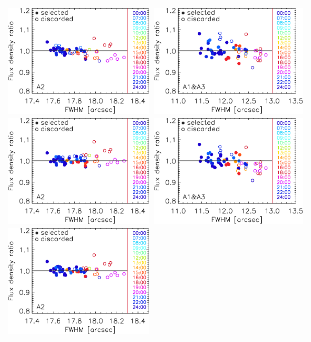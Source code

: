\begin{figure}[ht!]
\begin{center}
    \includegraphics[clip=true, width=0.3337\textwidth]{Figures/Calibration/plot_flux_density_ratio_fwhm_uranus_skydip_narrow_a2.pdf}
    \vspace{0.3cm}
    \includegraphics[clip=true, width=0.35\textwidth]{Figures/Calibration/plot_flux_density_ratio_fwhm_uranus_corrected_skydip_photocorr_demo_narrow_1mm.pdf}\hspace{0.2cm}
    \includegraphics[clip=true, width=0.3337\textwidth]{Figures/Calibration/plot_flux_density_ratio_fwhm_uranus_corrected_skydip_photocorr_demo_narrow_a2.pdf}
    \vspace{0.3cm}
    \includegraphics[clip=true, width=0.35\textwidth]{Figures/Calibration/plot_flux_density_ratio_fwhm_uranus_corrected_skydip_photocorr_pointing_narrow_1mm.pdf}\hspace{0.2cm}
    \includegraphics[clip=true, width=0.3337\textwidth]{Figures/Calibration/plot_flux_density_ratio_fwhm_uranus_corrected_skydip_photocorr_pointing_narrow_a2.pdf}

\end{center}
\end{figure}
